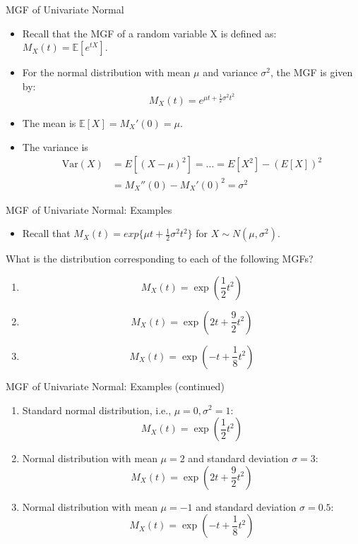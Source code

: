 \documentclass[
  ignorenonframetext,
]{beamer}
\providecommand{\tightlist}{%
  \setlength{\itemsep}{0pt}\setlength{\parskip}{0pt}}
\begin{document}
\begin{frame}{MGF of Univariate Normal}
\protect\hypertarget{mgf-of-univariate-normal}{}
\begin{itemize}
\item
  Recall that the MGF of a random variable X is defined as:
  \(M_X(t) = \mathbb{E}[e^{tX}]\).
\item
  For the normal distribution with mean \(\mu\) and variance
  \(\sigma^2\), the MGF is given by: \[
  M_X(t) = e^{\mu t + \frac{1}{2}\sigma^2t^2}
  \]
\item
  The mean is \(\mathbb{E}[X] = M_X'(0) = \mu\).
\item
  The variance is \[
  \begin{aligned}
  \text{Var}(X) &= E[(X-\mu)^2] = ... =E[X^2] - (E[X])^2\\
  &= M_X''(0) - M_X'(0)^2 = \sigma^2
  \end{aligned}\]
\end{itemize}
\end{frame}

\begin{frame}{MGF of Univariate Normal: Examples}
\protect\hypertarget{mgf-of-univariate-normal-examples}{}
\begin{itemize}
\tightlist
\item
  Recall that \(M_X(t)=exp\{\mu t + \frac{1}{2}{\sigma^2}t^2\}\) for
  \(X\sim N(\mu, \sigma^2)\).
\end{itemize}

What is the distribution corresponding to each of the following MGFs?

\begin{enumerate}
\item
  \[
     M_X(t) = \exp\left(\frac{1}{2}t^2\right)
     \]
\item
  \[
     M_X(t) = \exp\left(2t + \frac{9}{2}t^2\right)
     \]
\item
  \[
     M_X(t) = \exp\left(-t + \frac{1}{8}t^2\right)
     \]
\end{enumerate}
\end{frame}

\begin{frame}{MGF of Univariate Normal: Examples (continued)}
\protect\hypertarget{mgf-of-univariate-normal-examples-continued}{}
\begin{enumerate}
\item
  Standard normal distribution, i.e., \(\mu=0, \sigma^2=1\): \[
  M_X(t) = \exp\left(\frac{1}{2}t^2\right)
  \]
\item
  Normal distribution with mean \(\mu=2\) and standard deviation
  \(\sigma=3\): \[
  M_X(t) = \exp\left(2t + \frac{9}{2}t^2\right)
  \]
\item
  Normal distribution with mean \(\mu=-1\) and standard deviation
  \(\sigma=0.5\): \[
  M_X(t) = \exp\left(-t + \frac{1}{8}t^2\right)
  \]
\end{enumerate}
\end{frame}
\end{document}
